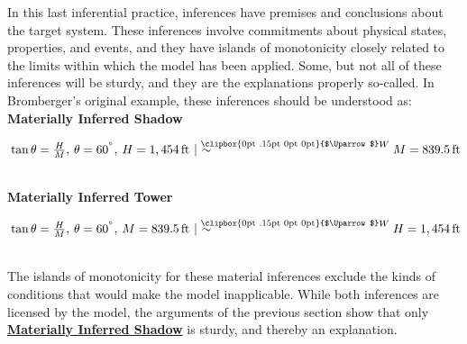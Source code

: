 \documentclass[natbib]{svjour3}                     %
\makeatletter
\newcommand{\Uuparrow}{%
	\raisebox{.2ex}{\clipbox{0pt .15pt 0pt 0pt}{$\Uparrow$}}
}
\newcommand{\nms}{%
	\mathbin{\mathpalette\@nms\expandafter}
}
\newcommand{\@nms}{\mid\joinrel\mkern-.5mu\sim}
\newcommand{\mrc}[1]{\mathbin{
		\mathchoice
		{\normalsize\hspace{.5mm}\nms^{\mkern-19mu\scriptsize\Uuparrow#1}\hspace{-.5mm}}
		{\normalsize\hspace{.5mm}\nms^{\mkern-19mu\scriptsize\Uuparrow#1}\hspace{-.5mm}}
		{\footnotesize\hspace{.5mm}\nms^{\mkern-13.5mu\fontsize{5.5}{0}\Uuparrow#1}}
		{\scriptsize\nms^{\mkern-10mu\tiny\Uuparrow#1}}
	}
}
\newcommand{\degree}{\ensuremath{^\circ}}
\makeatother
\begin{document}
In this last inferential practice, inferences have premises and conclusions about the target system. These inferences involve commitments about physical states, properties, and events, and they have islands of monotonicity closely related to the limits within which the model has been applied.  Some, but not all of these inferences will be sturdy, and they are the explanations properly so-called. In Bromberger's original example, these inferences should be understood as:\\ 


%

\noindent \label{eq:shadow_nm}\textbf{Materially Inferred Shadow}\hspace{8mm}\begin{minipage}[t]{.8\textwidth}
	$\hspace{.5ex} \tan \theta  = \frac{H}{M},\hspace{.5ex} \theta = 60^{\degree},\hspace{.5ex} H = 1,454\,\text{ft} \mrc{W}\, M = 839.5\,\text{ft}$
\end{minipage}\\ 

\noindent \label{eq:height_nm}\textbf{Materially Inferred Tower}\hspace{10.5mm}\begin{minipage}[t]{.8\textwidth}
	$\hspace{.5ex} \tan \theta  = \frac{H}{M},\hspace{.5ex} \theta = 60^{\degree},\hspace{.5ex} M = 839.5\,\text{ft} \mrc{W}\, H = 1,454\,\text{ft}$
\end{minipage}\\ 

\noindent  The islands of monotonicity for these material inferences exclude the kinds of conditions that would make the model inapplicable. While both inferences are licensed by the model, the arguments of the previous section show that only  \hyperref[eq:shadow_nm]{\textbf{Materially Inferred Shadow}} is sturdy, and thereby an explanation.


\end{document}
